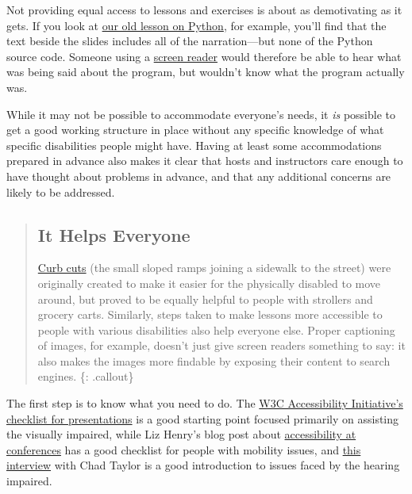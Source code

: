 Not providing equal access to lessons and exercises is about as
demotivating as it gets. If you look at
\href{http://swcarpentry.github.io/v4/python/flow.html}{our old lesson
on Python}, for example, you'll find that the text beside the slides
includes all of the narration---but none of the Python source code.
Someone using a
\href{https://en.wikipedia.org/wiki/Screen_reader}{screen reader} would
therefore be able to hear what was being said about the program, but
wouldn't know what the program actually was.

While it may not be possible to accommodate everyone's needs, it
\emph{is} possible to get a good working structure in place without any
specific knowledge of what specific disabilities people might have.
Having at least some accommodations prepared in advance also makes it
clear that hosts and instructors care enough to have thought about
problems in advance, and that any additional concerns are likely to be
addressed.

\begin{quote}
\subsection{It Helps Everyone}\label{it-helps-everyone}

\href{https://en.wikipedia.org/wiki/Curb_cut}{Curb cuts} (the small
sloped ramps joining a sidewalk to the street) were originally created
to make it easier for the physically disabled to move around, but proved
to be equally helpful to people with strollers and grocery carts.
Similarly, steps taken to make lessons more accessible to people with
various disabilities also help everyone else. Proper captioning of
images, for example, doesn't just give screen readers something to say:
it also makes the images more findable by exposing their content to
search engines. \{: .callout\}
\end{quote}

The first step is to know what you need to do. The
\href{http://www.w3.org/WAI/training/accessible}{W3C Accessibility
Initiative's checklist for presentations} is a good starting point
focused primarily on assisting the visually impaired, while Liz Henry's
blog post about
\href{https://modelviewculture.com/pieces/unlocking-the-invisible-elevator-accessibility-at-tech-conferences}{accessibility
at conferences} has a good checklist for people with mobility issues,
and
\href{https://modelviewculture.com/pieces/qa-making-tech-events-accessible-to-the-deaf-community}{this
interview} with Chad Taylor is a good introduction to issues faced by
the hearing impaired.

